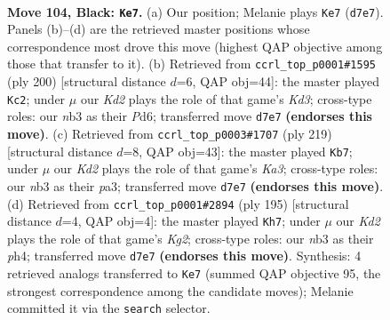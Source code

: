 \documentclass[11pt]{article}
\begin{document}
\clearpage

\begin{figure}[p]\centering
\begin{subfigure}{0.46\textwidth}\centering
\resizebox{\linewidth}{!}{%
\newchessgame
\chessboard[
  setfen={8/3k4/8/5K2/8/1N6/2R3Pr/8 b - - 73 104},
  showmover=false,
  pgfstyle=straightmove, color=movearrow, markmove={d7-e7}
]}
\caption{}
\end{subfigure}\hfill
\begin{subfigure}{0.46\textwidth}\centering
\resizebox{\linewidth}{!}{%
\newchessgame
\chessboard[
  setfen={8/8/r2P4/8/5k2/3K4/p7/R7 w - - 7 101},
  showmover=false,
  pgfstyle=straightmove, color=movearrow, markmove={d3-c2}
]}
\caption{}
\end{subfigure}
\\[4pt]
\begin{subfigure}{0.46\textwidth}\centering
\resizebox{\linewidth}{!}{%
\newchessgame
\chessboard[
  setfen={7R/8/k7/8/7P/P6r/1K6/8 b - - 4 110},
  showmover=false,
  pgfstyle=straightmove, color=movearrow, markmove={a6-b7}
]}
\caption{}
\end{subfigure}\hfill
\begin{subfigure}{0.46\textwidth}\centering
\resizebox{\linewidth}{!}{%
\newchessgame
\chessboard[
  setfen={1R6/1P4k1/8/2K5/7P/8/1r6/8 b - - 8 98},
  showmover=false,
  pgfstyle=straightmove, color=movearrow, markmove={g7-h7}
]}
\caption{}
\end{subfigure}
\caption{\textbf{Move 104, Black: \texttt{Ke7}.} (a) Our position; Melanie plays \texttt{Ke7} (\texttt{d7e7}). Panels (b)--(d) are the retrieved master positions whose correspondence most drove this move (highest QAP objective among those that transfer to it). (b) Retrieved from \texttt{ccrl\_top\_p0001\#1595} (ply 200) [structural distance $d$=6, QAP obj=44]: the master played \texttt{Kc2}; under $\mu$ our \emph{Kd2} plays the role of that game's \emph{Kd3}; cross-type roles: our \emph{n}b3 as their \emph{P}d6; transferred move \texttt{d7e7} \textbf{(endorses this move)}. (c) Retrieved from \texttt{ccrl\_top\_p0003\#1707} (ply 219) [structural distance $d$=8, QAP obj=43]: the master played \texttt{Kb7}; under $\mu$ our \emph{Kd2} plays the role of that game's \emph{Ka3}; cross-type roles: our \emph{n}b3 as their \emph{p}a3; transferred move \texttt{d7e7} \textbf{(endorses this move)}. (d) Retrieved from \texttt{ccrl\_top\_p0001\#2894} (ply 195) [structural distance $d$=4, QAP obj=4]: the master played \texttt{Kh7}; under $\mu$ our \emph{Kd2} plays the role of that game's \emph{Kg2}; cross-type roles: our \emph{n}b3 as their \emph{p}h4; transferred move \texttt{d7e7} \textbf{(endorses this move)}. Synthesis: 4 retrieved analogs transferred to \texttt{Ke7} (summed QAP objective 95, the strongest correspondence among the candidate moves); Melanie committed it via the \texttt{search} selector.}
\label{fig:thought-m207}
\end{figure}
\end{document}
